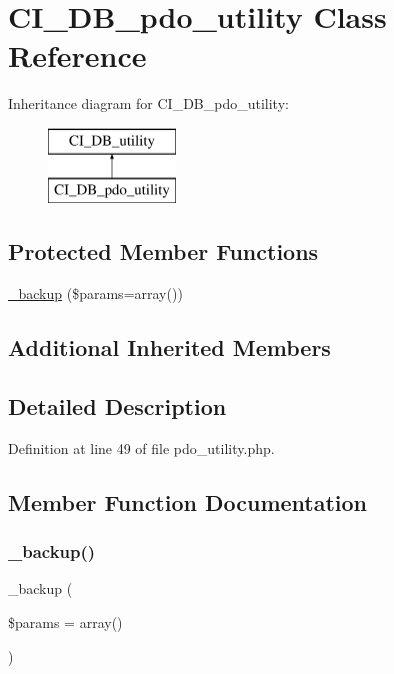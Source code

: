 \hypertarget{class_c_i___d_b__pdo__utility}{}\section{C\+I\+\_\+\+D\+B\+\_\+pdo\+\_\+utility Class Reference}
\label{class_c_i___d_b__pdo__utility}
Inheritance diagram for C\+I\+\_\+\+D\+B\+\_\+pdo\+\_\+utility\+:\begin{figure}[H]
\begin{center}
\leavevmode
\includegraphics[height=2.000000cm]{class_c_i___d_b__pdo__utility}
\end{center}
\end{figure}
\subsection*{Protected Member Functions}
\begin{DoxyCompactItemize}
\item 
\mbox{\hyperlink{class_c_i___d_b__pdo__utility_a30f3053d2c82e7562349924363507afa}{\+\_\+backup}} (\$params=array())
\end{DoxyCompactItemize}
\subsection*{Additional Inherited Members}


\subsection{Detailed Description}


Definition at line 49 of file pdo\+\_\+utility.\+php.



\subsection{Member Function Documentation}
\mbox{\label{class_c_i___d_b__pdo__utility_a30f3053d2c82e7562349924363507afa}} 
\subsubsection{\texorpdfstring{\_backup()}{\_backup()}}
{\footnotesize\ttfamily \+\_\+backup (\begin{DoxyParamCaption}\item[{}]{\$params = {\ttfamily array()} }\end{DoxyParamCaption})\hspace{0.3cm}{\ttfamily [protected]}}

